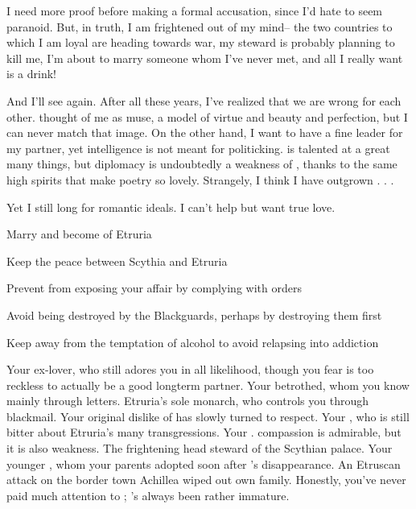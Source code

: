 \documentclass[char]{Kos}
\begin{document}
I need more proof before making a formal accusation, since I'd hate to seem paranoid. But, in truth, I am frightened out of my mind-- the two countries to which I am loyal are heading towards war, my steward is probably planning to kill me, I'm about to marry someone whom I've never met, and all I really want is a drink!

And I'll see \cPoet{} again. After all these years, I've realized that we are wrong for each other. \cPoet{\They} thought of me as \cPoet{\their} muse, a model of virtue and beauty and perfection, but I can never match that image. On the other hand, I want to have a fine leader for my partner, yet \cPoet{\their} intelligence is not meant for politicking. \cPoet{\They} is talented at a great many things, but diplomacy is undoubtedly a weakness of \cPoet{\theirs}, thanks to the same high spirits that make \cPoet{\their} poetry so lovely. Strangely, I think I have outgrown \cPoet{\them} . . .

Yet I still long for \cPoet{\their} romantic ideals. I can't help but want true love.

\begin{itemz}[Goals]
 \item Marry \cGroom{} and become \cBride{\prince} of Etruria
 \item Keep the peace between Scythia and Etruria
 \item Prevent \cEtruriaKing{} from exposing your affair by complying with \cEtruriaKing{\their} orders
 \item Avoid being destroyed by the Blackguards, perhaps by destroying them first
 \item Keep away from the temptation of alcohol to avoid relapsing into addiction
\end{itemz}

\begin{contacts}
\contact{\cPoet{}} Your ex-lover, who still adores you in all likelihood, though you fear \cPoet{\they} is too reckless to actually be a good longterm partner.
\contact{\cGroom{}} Your betrothed, whom you know mainly through letters.
\contact{\cEtruriaKing{}} Etruria's sole monarch, who controls you through blackmail. Your original dislike of \cEtruriaKing{\them} has slowly turned to respect.
\contact{\cScythiaQueen{}} Your \cScythiaQueen{\parent}, who is still bitter about Etruria's many transgressions. 
\contact{\cScythiaKing{}} Your \cScythiaKing{\parent}. \cScythiaKing{\Their} compassion is admirable, but it is also \cScythiaKing{\their} weakness.
\contact{\cButler{}} The frightening head steward of the Scythian palace.
\contact{\cWard{}} Your younger \cWard{\sibling}, whom your parents adopted soon after \cFugitive{}'s disappearance. An Etruscan attack on the border town Achillea wiped out \cWard{\their} own family. Honestly, you've never paid much attention to \cWard{\them}; \cWard{\they}'s always been rather immature.
\end{contacts}
\end{document}
